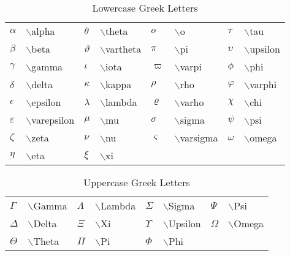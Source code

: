 \documentclass{llncs}
\begin{document}
\begin{table}
\begin{center}
\caption{\label{lg}Lowercase Greek Letters}
\renewcommand{\arraystretch}{0.5}
\setlength\tabcolsep{3pt}
\begin{tabular}{llllllll}
\hline\noalign{\smallskip}
$\alpha$ 			& $\backslash$alpha 			& $\theta$ 	& $\backslash$theta	 & $o$ 	  & $\backslash$o & $\tau$ 	& $\backslash$tau\\
$\beta$ 			& $\backslash$beta 				& $\vartheta$ & $\backslash$vartheta & $\pi$ & $\backslash$pi & $\upsilon$ 	& $\backslash$upsilon\\
$\gamma$ 			& $\backslash$gamma 			& $\iota$   & $\backslash$iota   & $\varpi$     & $\backslash$varpi & $\phi$ 	& $\backslash$phi\\
$\delta$ 			& $\backslash$delta 			& $\kappa$ 	& $\backslash$kappa	 & $\rho$ & $\backslash$rho & $\varphi$ 	& $\backslash$varphi\\
$\epsilon$ 		& $\backslash$epsilon 		& $\lambda$ & $\backslash$lambda & $\varrho$    & $\backslash$varho & $\chi$ 	& $\backslash$chi\\
$\varepsilon$ & $\backslash$varepsilon 	& $\mu$ 		& $\backslash$mu 		 & $\sigma$     & $\backslash$sigma & $\psi$ 	& $\backslash$psi	 \\
$\zeta$ 			& $\backslash$zeta 				& $\nu$ 		& $\backslash$nu 		& $\varsigma$& $\backslash$varsigma & $\omega$ 	& $\backslash$omega	 \\
$\eta$ 				& $\backslash$eta 				& $\xi$ 		& $\backslash$xi\\
\hline
\end{tabular}
\end{center}
\end{table}

\vspace{-10mm}

\begin{table}
\begin{center}
\caption{\label{cg}Uppercase Greek Letters}
\renewcommand{\arraystretch}{0.5}
\setlength\tabcolsep{3pt}
\begin{tabular}{llllllll}
\hline\noalign{\smallskip}
$\Gamma$ & $\backslash$Gamma & $\Lambda$ & $\backslash$Lambda & $\Sigma$ & $\backslash$Sigma & $\Psi$ & $\backslash$Psi\\
$\Delta$ & $\backslash$Delta& $\Xi$ & $\backslash$Xi& $\Upsilon$ & $\backslash$Upsilon& $\Omega$ & $\backslash$Omega\\
$\Theta$ & $\backslash$Theta& $\Pi$ & $\backslash$Pi& $\Phi$ & $\backslash$Phi\\
\hline
\end{tabular}
\end{center}
\end{table}
\end{document}
